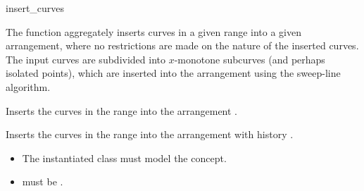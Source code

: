 \ccRefPageBegin

\begin{ccRefFunction}{insert_curves}

\ccDefinition

The function \ccRefName{} aggregately inserts curves in a given range into
a given arrangement, where no restrictions are made on the nature of
the inserted curves.  The input curves are subdivided into
$x$-monotone subcurves (and perhaps isolated points), which are inserted
into the arrangement using the sweep-line algorithm.



Inserts the curves in the range \ccc{[first,last)} into the
arrangement .




Inserts the curves in the range \ccc{[first,last)} into the
arrangement with history .

\ccRequirements
\begin{itemize}
\item The instantiated  class must model the
   concept.
\item {} must be .
\end{itemize}

\end{ccRefFunction}

\ccRefPageEnd
